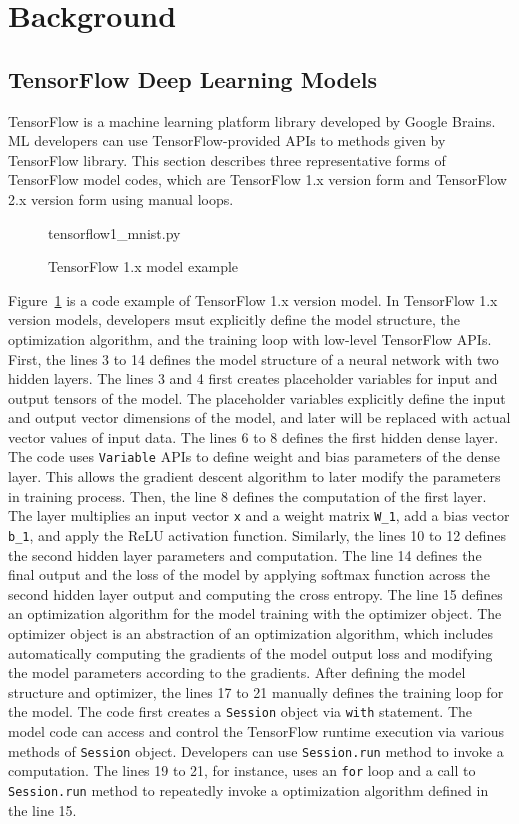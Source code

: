 \section{Background}\label{sec:background}
\subsection{TensorFlow Deep Learning Models}

TensorFlow\cite{tensorflow} is a machine learning platform library
developed by Google Brains.
ML developers can use TensorFlow-provided APIs to 
methods given by TensorFlow library.
This section describes three representative forms of TensorFlow
model codes, which are TensorFlow 1.x version form 
and TensorFlow 2.x version form using manual loops.

\begin{figure}[ht!]

{tensorflow1_mnist.py}
  \caption{TensorFlow 1.x model example}
\label{fig:back:tf1}
\end{figure}

Figure~\ref{fig:back:tf1} is a code example of TensorFlow 1.x version model.
In TensorFlow 1.x version models, developers msut explicitly define
the model structure, the optimization algorithm, and the training loop 
with low-level TensorFlow APIs.
First, the lines 3 to 14 defines the model
structure of a neural network with two hidden layers.
The lines 3 and 4 first creates placeholder variables for input and output
tensors of the model. The placeholder variables explicitly define the
input and output vector dimensions of the model, and later will
be replaced with actual vector values of input data.
The lines 6 to 8 defines the first hidden dense layer.
The code uses {\tt Variable} APIs to define weight and bias parameters of
the dense layer. This allows the gradient descent algorithm to 
later modify the parameters in training process. 
Then, the line 8 defines the computation of the first layer.
The layer multiplies an input vector {\tt x} and a weight matrix
{\tt W\_1}, add a bias vector {\tt b\_1}, and apply the ReLU activation
function.
Similarly, the lines 10 to 12 defines the second hidden layer parameters
and computation.
The line 14 defines the final output and the loss of the model by
applying softmax function across the second hidden layer output and
computing the cross entropy. 
The line 15 defines an optimization algorithm for the model training with
the optimizer object.
The optimizer object is an abstraction of an optimization algorithm,
which includes automatically computing the gradients of the model output loss 
and modifying the model parameters according to the gradients.
After defining the model structure and optimizer, the lines 17 to 21
manually defines the training loop for the model.
The code first creates a {\tt Session} object via {\tt with} statement.
The model code can access and control the TensorFlow runtime execution
via various methods of {\tt Session} object.
Developers can use {\tt Session.run} method to invoke a computation.
The lines 19 to 21, for instance, uses an {\tt for} loop and
a call to {\tt Session.run} method to repeatedly invoke a
optimization algorithm defined in the line 15.

